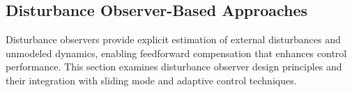 \subsection{Disturbance Observer-Based Approaches}

Disturbance observers provide explicit estimation of external disturbances and unmodeled dynamics, enabling feedforward compensation that enhances control performance. This section examines disturbance observer design principles and their integration with sliding mode and adaptive control techniques.



